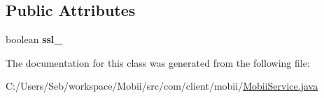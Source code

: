 \subsection*{Public Attributes}
\begin{DoxyCompactItemize}
\item 
\hypertarget{classcom_1_1client_1_1mobii_1_1_mobii_service_a1d3349e31df86bb37f32b385d27110c6}{boolean {\bfseries ssl\-\_\-}}\label{classcom_1_1client_1_1mobii_1_1_mobii_service_a1d3349e31df86bb37f32b385d27110c6}

\end{DoxyCompactItemize}


The documentation for this class was generated from the following file\-:\begin{DoxyCompactItemize}
\item 
C\-:/\-Users/\-Seb/workspace/\-Mobii/src/com/client/mobii/\hyperlink{_mobii_service_8java}{Mobii\-Service.\-java}\end{DoxyCompactItemize}
